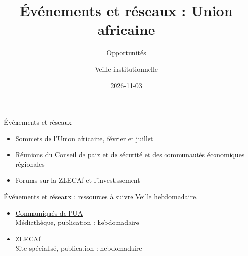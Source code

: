 \documentclass[aspectratio=169,11pt]{beamer}
\title{Événements et réseaux : Union africaine}
\subtitle{Opportunités}
\author{Veille institutionnelle}
\date{2026-11-03}
\begin{document}
\begin{frame}\titlepage\end{frame}

\begin{frame}{Événements et réseaux}
\begin{itemize}
\item Sommets de l'Union africaine, février et juillet
\item Réunions du Conseil de paix et de sécurité et des communautés économiques régionales
\item Forums sur la ZLECAf et l'investissement
\end{itemize}
\end{frame}

\begin{frame}{Événements et réseaux : ressources à suivre}
\small
Veille hebdomadaire.
\begin{itemize}
\item \href{https://au.int/en/pressreleases}{Communiqués de l'UA}\\{\footnotesize Médiathèque, publication : hebdomadaire}
\item \href{https://au-afcfta.org}{ZLECAf}\\{\footnotesize Site spécialisé, publication : hebdomadaire}
\end{itemize}
\end{frame}
\end{document}
